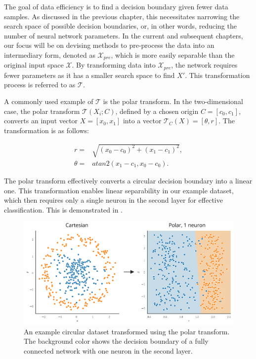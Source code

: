 
The goal of data efficiency is to find a decision boundary given fewer data samples. As discussed in the previous chapter, this necessitates narrowing the search space of possible decision boundaries, or, in other words, reducing the number of neural network parameters. In the current and subsequent chapters, our focus will be on devising methods to pre-process the data into an intermediary form, denoted as \(\mathcal{X}_{pre}\), which is more easily separable than the original input space \(\mathcal{X}\). By transforming data into \(\mathcal{X}_{pre}\), the network requires fewer parameters as it has a smaller search space to find \(X'\). This transformation process is referred to as \(\mathcal{T}\).

A commonly used example of $\mathcal{T}$ is the polar transform. In the two-dimensional case, the polar transform \(\mathcal{T}(X_i; C)\), defined by a chosen origin \(C = [c_0, c_1]\), converts an input vector \(X = [x_0, x_1]\) into a vector \(\mathcal{T}_C(X) = [\theta, r]\). The transformation is as follows:

\begin{equation}
    \begin{aligned}
	r =& \sqrt{(x_0 - c_0)^2 + (x_1 - c_1)^2},\\
	\theta =& atan2(x_1 - c_1, x_0 - c_0).
    \end{aligned}
\end{equation}

The polar transform effectively converts a circular decision boundary into a linear one. This transformation enables linear separability in our example dataset, which then requires only a single neuron in the second layer for effective classification. This is demonstrated in .

	\begin{figure}[h]
		\centering
		\includegraphics[width=0.65\linewidth]{images/4/polar_dataset_neurons}
		\caption{An example circular dataset transformed using the polar transform. The background color shows the decision boundary of a fully connected network with one neuron in the second layer.}
		\label{fig:polar_dataset_neurons}
	\end{figure}
	
